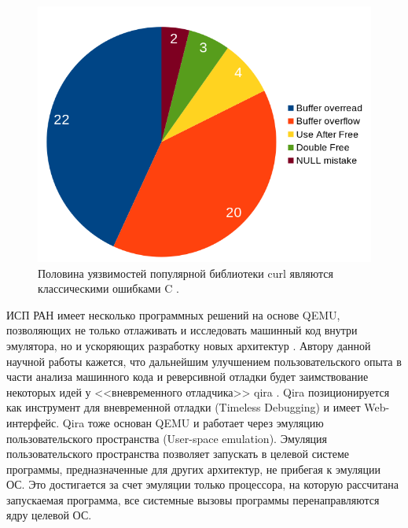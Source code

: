 \begin{figure}[!htbp]
    \centering
    \begin{adjustbox}{max totalsize={0.8\textwidth}{\textheight}}
        \includegraphics[]{images/curl-c-issues.png}
    \end{adjustbox}
    \caption{Половина уязвимостей популярной библиотеки curl \cite{curl}
    являются классическими ошибками C \cite{curl-errors}.}\label{fig:curl-c-issues}
\end{figure}

ИСП РАН имеет несколько программных решений на основе QEMU, позволяющих не только отлаживать и исследовать
машинный код внутри эмулятора, но и ускоряющих разработку новых архитектур \cite{imposters-toolset}.
Автору данной научной работы кажется, что дальнейшим улучшением пользовательского опыта в части анализа машинного кода
и реверсивной отладки будет заимствование некоторых идей у <<вневременного отладчика>> qira \cite{qira}.
Qira позиционируется как инструмент для вневременной отладки (Timeless Debugging) и имеет Web-интерфейс.
Qira тоже основан QEMU и работает через эмуляцию пользовательского пространства (User-space emulation).
Эмуляция пользовательского пространства позволяет запускать в целевой системе программы,
предназначенные для других архитектур, не прибегая к эмуляции ОС.
Это достигается за счет эмуляции только процессора, на которую рассчитана запускаемая
программа, все системные вызовы программы перенаправляются ядру целевой ОС.

